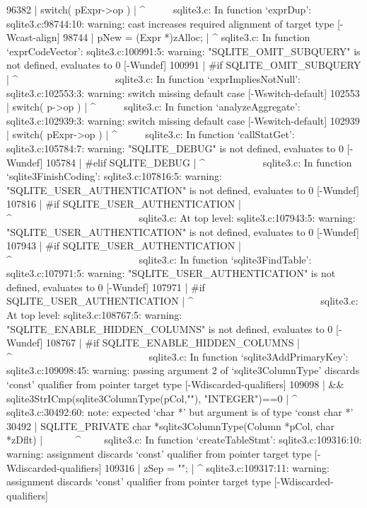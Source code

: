 {{{{{{{{{{{{96382 |   switch( pExpr->op ){
      |   ^~~~~~
sqlite3.c: In function ‘exprDup’:
sqlite3.c:98744:10: warning: cast increases required alignment of target type [-Wcast-align]
98744 |   pNew = (Expr *)zAlloc;
      |          ^
sqlite3.c: In function ‘exprCodeVector’:
sqlite3.c:100991:5: warning: "SQLITE_OMIT_SUBQUERY" is not defined, evaluates to 0 [-Wundef]
100991 | #if SQLITE_OMIT_SUBQUERY
       |     ^~~~~~~~~~~~~~~~~~~~
sqlite3.c: In function ‘exprImpliesNotNull’:
sqlite3.c:102553:3: warning: switch missing default case [-Wswitch-default]
102553 |   switch( p->op ){
       |   ^~~~~~
sqlite3.c: In function ‘analyzeAggregate’:
sqlite3.c:102939:3: warning: switch missing default case [-Wswitch-default]
102939 |   switch( pExpr->op ){
       |   ^~~~~~
sqlite3.c: In function ‘callStatGet’:
sqlite3.c:105784:7: warning: "SQLITE_DEBUG" is not defined, evaluates to 0 [-Wundef]
105784 | #elif SQLITE_DEBUG
       |       ^~~~~~~~~~~~
sqlite3.c: In function ‘sqlite3FinishCoding’:
sqlite3.c:107816:5: warning: "SQLITE_USER_AUTHENTICATION" is not defined, evaluates to 0 [-Wundef]
107816 | #if SQLITE_USER_AUTHENTICATION
       |     ^~~~~~~~~~~~~~~~~~~~~~~~~~
sqlite3.c: At top level:
sqlite3.c:107943:5: warning: "SQLITE_USER_AUTHENTICATION" is not defined, evaluates to 0 [-Wundef]
107943 | #if SQLITE_USER_AUTHENTICATION
       |     ^~~~~~~~~~~~~~~~~~~~~~~~~~
sqlite3.c: In function ‘sqlite3FindTable’:
sqlite3.c:107971:5: warning: "SQLITE_USER_AUTHENTICATION" is not defined, evaluates to 0 [-Wundef]
107971 | #if SQLITE_USER_AUTHENTICATION
       |     ^~~~~~~~~~~~~~~~~~~~~~~~~~
sqlite3.c: At top level:
sqlite3.c:108767:5: warning: "SQLITE_ENABLE_HIDDEN_COLUMNS" is not defined, evaluates to 0 [-Wundef]
108767 | #if SQLITE_ENABLE_HIDDEN_COLUMNS
       |     ^~~~~~~~~~~~~~~~~~~~~~~~~~~~
sqlite3.c: In function ‘sqlite3AddPrimaryKey’:
sqlite3.c:109098:45: warning: passing argument 2 of ‘sqlite3ColumnType’ discards ‘const’ qualifier from pointer target type [-Wdiscarded-qualifiers]
109098 |    && sqlite3StrICmp(sqlite3ColumnType(pCol,""), "INTEGER")==0
       |                                             ^~
sqlite3.c:30492:60: note: expected ‘char *’ but argument is of type ‘const char *’
30492 | SQLITE_PRIVATE char *sqlite3ColumnType(Column *pCol, char *zDflt){
      |                                                      ~~~~~~^~~~~
sqlite3.c: In function ‘createTableStmt’:
sqlite3.c:109316:10: warning: assignment discards ‘const’ qualifier from pointer target type [-Wdiscarded-qualifiers]
109316 |     zSep = "";
       |          ^
sqlite3.c:109317:11: warning: assignment discards ‘const’ qualifier from pointer target type [-Wdiscarded-qualifiers]
}}}}}}}}}}}}}}}}
